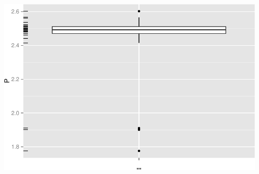 \documentclass[]{article}
\begin{document}
\includegraphics{AnalysisProcedure_files/figure-latex/work_mean_power-1.pdf}
\end{document}
